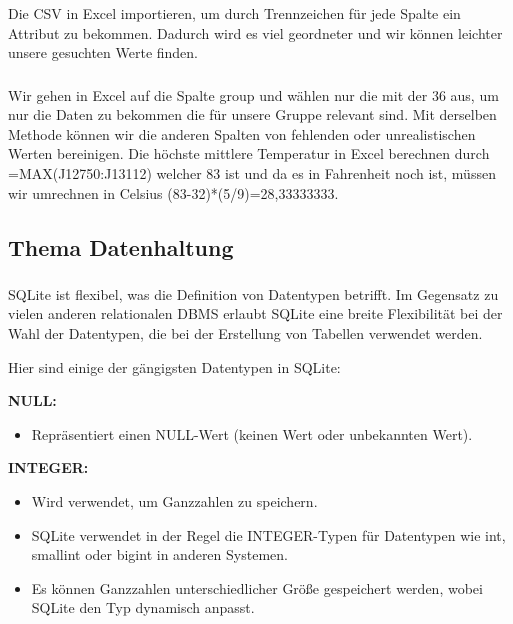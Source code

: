 \documentclass{article}
\begin{document}
\subsubsection{}

Die CSV in Excel importieren, um durch Trennzeichen für jede Spalte ein Attribut zu bekommen. Dadurch wird es viel geordneter und wir können leichter unsere gesuchten Werte finden.

\subsubsection{}

Wir gehen in Excel auf die Spalte group und wählen nur die mit der 36 aus, um nur die Daten zu bekommen die für unsere Gruppe relevant sind. Mit derselben Methode können wir die anderen Spalten von fehlenden oder unrealistischen Werten bereinigen. Die höchste mittlere Temperatur in Excel berechnen durch =MAX(J12750:J13112) welcher 83 ist und da es in Fahrenheit noch ist, müssen wir umrechnen in Celsius (83-32)*(5/9)=28,33333333.

\subsection{Thema Datenhaltung}
\subsubsection{}

SQLite ist flexibel, was die Definition von Datentypen betrifft. Im Gegensatz zu vielen anderen relationalen DBMS erlaubt SQLite eine breite Flexibilität bei der Wahl der Datentypen, die bei der Erstellung von Tabellen verwendet werden.

Hier sind einige der gängigsten Datentypen in SQLite:

\textbf{NULL:}

\begin{itemize}
  
\item \textbf{}Repräsentiert einen NULL-Wert (keinen Wert oder unbekannten Wert).

\end{itemize}

\textbf{INTEGER:}

\begin{itemize}

\item \textbf{}Wird verwendet, um Ganzzahlen zu speichern.

\item \textbf{}SQLite verwendet in der Regel die INTEGER-Typen für Datentypen wie int, smallint oder bigint in anderen Systemen.

\item \textbf{}Es können Ganzzahlen unterschiedlicher Größe gespeichert werden, wobei SQLite den Typ dynamisch anpasst.

\end{itemize}
\end{document}
